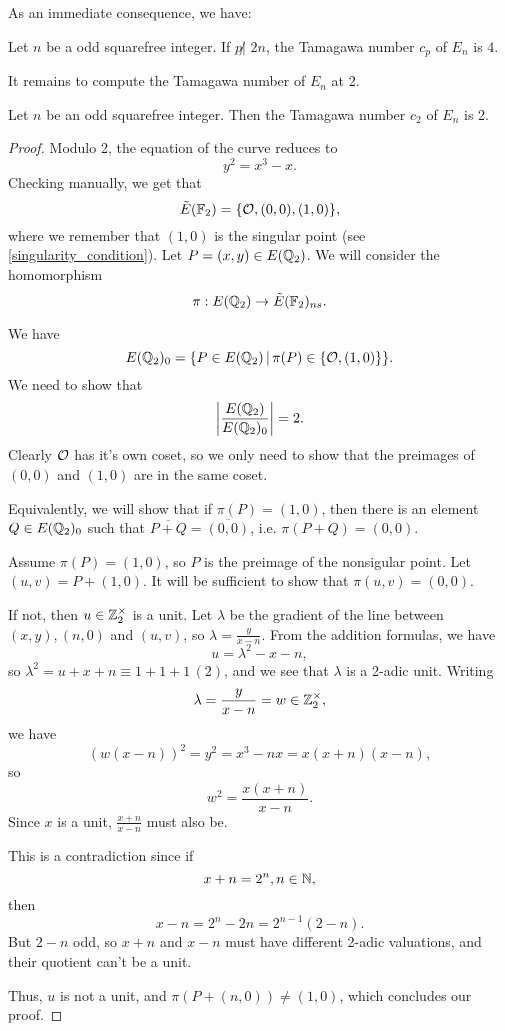 \documentclass[12pt, a4paper]{amsart}
\begin{document}
As an immediate consequence, we have: 

\begin{thm}
  Let $n$ be a odd squarefree integer.
  If $p \not| \,\, 2n $, the Tamagawa number $c_p$ of $E_n$ is 4.
\end{thm}

It remains to compute the Tamagawa number of $E_n$ at 2.

\begin{thm}
  Let $n$ be an odd squarefree integer. Then the Tamagawa number $c_2$
  of $E_n$ is 2.
\end{thm}

\begin{proof}
  Modulo 2, the equation of the curve reduces to
  \[y^2 = x^3 - x.\]
  Checking manually, we get that 
  \[\tilde{E}(\mathbb{F}_2) = \{{\mathcal O}, (0,0), (1,0)\},\]
  where we remember that $(1,0)$ is the singular point
  (see \autoref{singularity_condition}).
  Let $P = (x,y) \in E({\mathbb Q}_2)$. We will consider the homomorphism
  \[\pi: E({\mathbb Q}_2) \rightarrow \tilde{E}(\mathbb{F}_2)_{ns}.\]

  We have
  \[E({\mathbb Q}_2)_0 = \{P \in E({\mathbb Q}_2) \, | \, \pi(P) \in \{ {\mathcal O}, (1,0)\}\}.\]
  We need to show that
  \[\left| \frac{E({\mathbb Q}_2)}{E({\mathbb Q}_2)_0} \right| = 2.\]
  Clearly ${\mathcal O}$ has it's own coset, so we only need to show that the preimages
  of $(0,0)$ and $(1,0)$ are in the same coset.
  
  Equivalently, we will show that if $\pi(P) = (1,0)$, then there is an
  element $Q \in E({\mathbb Q}_2)_0$ such that $\overline{P+Q} = \overline{(0,0)}$,
  i.e. $\pi(P+Q) = (0,0)$.
  
  Assume $\pi(P) = (1,0)$, so $P$ is the preimage of the nonsigular point.
  Let $(u,v) = P + (1,0)$. It will be sufficient to show that $\pi(u,v) = (0,0)$.

  If not, then $u \in {\mathbb Z}_2^{\times}$ is a unit. Let $\lambda$ be the gradient of the
  line between $(x,y), (n,0)$ and $(u,v)$, so $\lambda = \frac{y}{x-n}$.
  From the addition formulas, we have
  \[u = \lambda^2 - x - n,\]
  so $\lambda^2 = u + x + n \equiv 1 + 1 + 1\, (2)$, and we see that $\lambda$
  is a 2-adic unit. Writing
  \[\lambda = \frac{y}{x-n} = w \in {\mathbb Z}_2^{\times},\]
  we have
  \[(w(x-n))^2 = y^2 = x^3 -nx = x(x+n)(x-n),\]
  so
  \[w^2 = \frac{x(x+n)}{x-n}.\]
  Since $x$ is a unit, $\frac{x+n}{x-n}$ must also be.

  This is a contradiction since if
  $$x+n = 2^n, n \in {\mathbb N},$$ then $$x-n = 2^n - 2n
  = 2^{n-1}(2-n).$$
  But $2-n$ odd, so $x+n$ and $x-n$ must have different 2-adic
  valuations, and their quotient can't be a unit.

  Thus, $u$ is not a unit, and $\pi(P+(n,0)) \neq (1,0)$, which concludes our proof.
\end{proof}








\printbibliography
\end{document}
